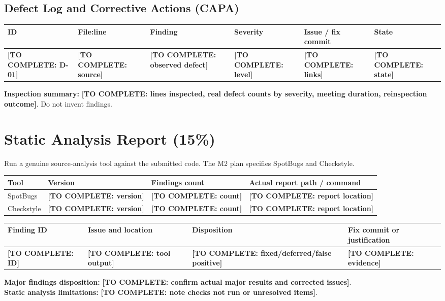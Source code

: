 \documentclass[11pt,a4paper]{article}
\newcommand{\todo}[1]{\textcolor{red!70!black}{\textbf{[TO COMPLETE: #1]}}}
\begin{document}
\subsection{Defect Log and Corrective Actions (CAPA)}
\begin{longtable}{L{1.2cm} L{2.6cm} L{2.5cm} L{1.6cm} L{2.5cm} L{2cm}}\toprule
\textbf{ID} & \textbf{File:line} & \textbf{Finding} & \textbf{Severity} & \textbf{Issue / fix commit} & \textbf{State}\\\midrule\endhead
\todo{D-01} & \todo{source} & \todo{observed defect} & \todo{level} & \todo{links} & \todo{state}\\\bottomrule\end{longtable}
\textbf{Inspection summary:} \todo{lines inspected, real defect counts by severity, meeting duration, reinspection outcome}. Do not invent findings.

\section{Static Analysis Report (15\%)}\label{sec:static}
Run a genuine source-analysis tool against the submitted code. The M2 plan specifies SpotBugs and Checkstyle.\par
\begin{longtable}{L{3cm} L{2.2cm} L{2.7cm} L{4.4cm}}\toprule
\textbf{Tool} & \textbf{Version} & \textbf{Findings count} & \textbf{Actual report path / command}\\\midrule\endhead
SpotBugs & \todo{version} & \todo{count} & \todo{report location}\\
Checkstyle & \todo{version} & \todo{count} & \todo{report location}\\\bottomrule\end{longtable}
\begin{longtable}{L{1.7cm} L{3.9cm} L{2.2cm} L{4.7cm}}\toprule
\textbf{Finding ID} & \textbf{Issue and location} & \textbf{Disposition} & \textbf{Fix commit or justification}\\\midrule\endhead
\todo{ID} & \todo{tool output} & \todo{fixed/deferred/false positive} & \todo{evidence}\\\bottomrule\end{longtable}
\textbf{Major findings disposition:} \todo{confirm actual major results and corrected issues}.\\
\textbf{Static analysis limitations:} \todo{note checks not run or unresolved items}.
\end{document}
